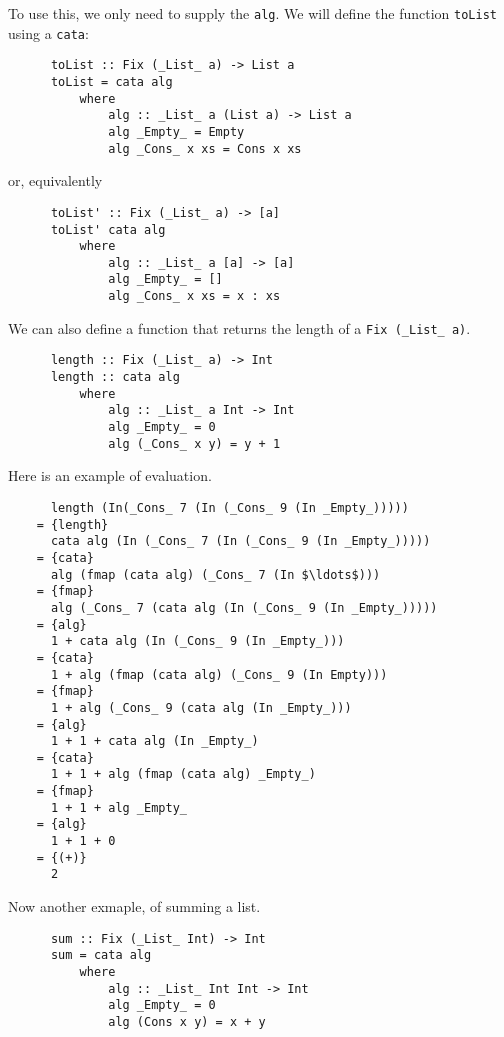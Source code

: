 \documentclass[a4paper,12pt]{article}
\theoremstyle{remark}
\begin{document}
  To use this, we only need to supply the \lstinline{alg}. We will define the function \lstinline{toList}
  using a \lstinline{cata}:

  \begin{lstlisting}
      toList :: Fix (_List_ a) -> List a
      toList = cata alg
          where
              alg :: _List_ a (List a) -> List a
              alg _Empty_ = Empty
              alg _Cons_ x xs = Cons x xs  \end{lstlisting}

  or, equivalently

  \begin{lstlisting}
      toList' :: Fix (_List_ a) -> [a]
      toList' cata alg
          where
              alg :: _List_ a [a] -> [a]
              alg _Empty_ = []
              alg _Cons_ x xs = x : xs  \end{lstlisting}

  We can also define a function that returns the length of a \lstinline{Fix (_List_ a)}.

  \begin{lstlisting}
      length :: Fix (_List_ a) -> Int
      length :: cata alg
          where
              alg :: _List_ a Int -> Int
              alg _Empty_ = 0
              alg (_Cons_ x y) = y + 1  \end{lstlisting}

  Here is an example of evaluation.

  \begin{lstlisting}
      length (In(_Cons_ 7 (In (_Cons_ 9 (In _Empty_)))))
    = {length}
      cata alg (In (_Cons_ 7 (In (_Cons_ 9 (In _Empty_)))))
    = {cata}
      alg (fmap (cata alg) (_Cons_ 7 (In $\ldots$)))
    = {fmap}
      alg (_Cons_ 7 (cata alg (In (_Cons_ 9 (In _Empty_)))))
    = {alg}
      1 + cata alg (In (_Cons_ 9 (In _Empty_)))
    = {cata}
      1 + alg (fmap (cata alg) (_Cons_ 9 (In Empty)))
    = {fmap}
      1 + alg (_Cons_ 9 (cata alg (In _Empty_)))
    = {alg}
      1 + 1 + cata alg (In _Empty_)
    = {cata}
      1 + 1 + alg (fmap (cata alg) _Empty_)
    = {fmap}
      1 + 1 + alg _Empty_
    = {alg}
      1 + 1 + 0
    = {(+)}
      2  \end{lstlisting}

  Now another exmaple, of summing a list.

  \begin{lstlisting}
      sum :: Fix (_List_ Int) -> Int
      sum = cata alg
          where
              alg :: _List_ Int Int -> Int
              alg _Empty_ = 0
              alg (Cons x y) = x + y  \end{lstlisting}
\end{document}
